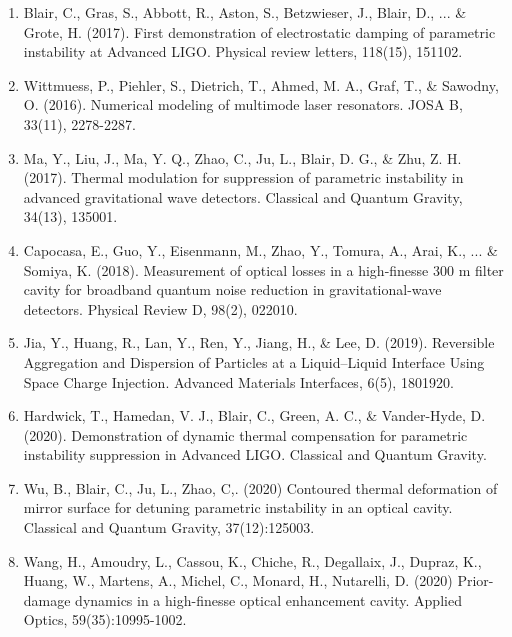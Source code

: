 \begin{enumerate}
\item Blair, C., Gras, S., Abbott, R., Aston, S., Betzwieser, J., Blair, D., ... \& Grote, H. (2017). First demonstration of electrostatic damping of parametric instability at Advanced LIGO. Physical review letters, 118(15), 151102.

\item Wittmuess, P., Piehler, S., Dietrich, T., Ahmed, M. A., Graf, T., \& Sawodny, O. (2016). Numerical modeling of multimode laser resonators. JOSA B, 33(11), 2278-2287.

\item Ma, Y., Liu, J., Ma, Y. Q., Zhao, C., Ju, L., Blair, D. G., \& Zhu, Z. H. (2017). Thermal modulation for suppression of parametric instability in advanced gravitational wave detectors. Classical and Quantum Gravity, 34(13), 135001.

\item Capocasa, E., Guo, Y., Eisenmann, M., Zhao, Y., Tomura, A., Arai, K., ... \& Somiya, K. (2018). Measurement of optical losses in a high-finesse 300 m filter cavity for broadband quantum noise reduction in gravitational-wave detectors. Physical Review D, 98(2), 022010.

\item Jia, Y., Huang, R., Lan, Y., Ren, Y., Jiang, H., \& Lee, D. (2019). Reversible Aggregation and Dispersion of Particles at a Liquid–Liquid Interface Using Space Charge Injection. Advanced Materials Interfaces, 6(5), 1801920.

\item Hardwick, T., Hamedan, V. J., Blair, C., Green, A. C., \& Vander-Hyde, D. (2020). Demonstration of dynamic thermal compensation for parametric instability suppression in Advanced LIGO.  Classical and Quantum Gravity.
    
\item Wu, B., Blair, C., Ju, L., Zhao, C,. (2020) Contoured thermal deformation of mirror surface for detuning parametric instability in an optical cavity. Classical and Quantum Gravity, 37(12):125003.
   
 \item Wang, H., Amoudry, L., Cassou, K., Chiche, R., Degallaix, J., Dupraz, K., Huang, W., Martens, A., Michel, C., Monard, H., Nutarelli, D. (2020) Prior-damage dynamics in a high-finesse optical enhancement cavity. Applied Optics, 59(35):10995-1002.

\end{enumerate}
